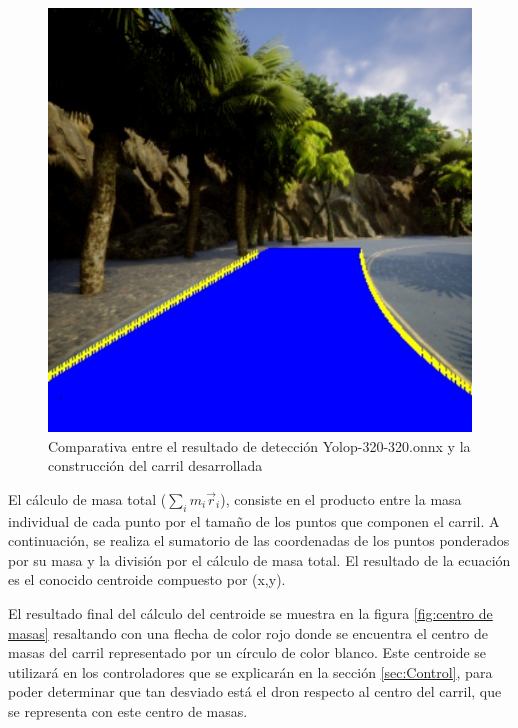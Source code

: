 \begin{figure}[H]
\begin{minipage}[t]{0.2\textwidth}
  \end{minipage}
  \hfill
  \begin{minipage}[t]{0.2\textwidth}
      \centering
      \includegraphics[width=\textwidth]{figs/Diseño/Regresiones/interpolación4.jpg}
  \end{minipage}
  \caption{Comparativa entre el resultado de detección Yolop-320-320.onnx y la construcción del carril desarrollada}
  \label{comparativa-interpolacion}
  \vspace{-1.5em}
\end{figure}
  El cálculo de masa total ($\sum_{i}m_{i} \vec{r}_{i}$), consiste en el producto entre la masa individual de cada punto por el tamaño de los puntos que componen el carril. A continuación, 
  se realiza el sumatorio de las coordenadas de los puntos ponderados por su masa y la división por el cálculo de masa total. El resultado de la ecuación es el conocido centroide 
  compuesto por (x,y).
  
  El resultado final del cálculo del centroide se muestra en la figura \ref{fig:centro de masas} resaltando con una flecha de color rojo donde se encuentra
  el centro de masas del carril representado por un círculo de color blanco. Este centroide se utilizará en los controladores que se explicarán
  en la sección \ref{sec:Control}, para poder determinar que tan desviado está el dron respecto al centro del carril, que se representa con este centro de masas.

